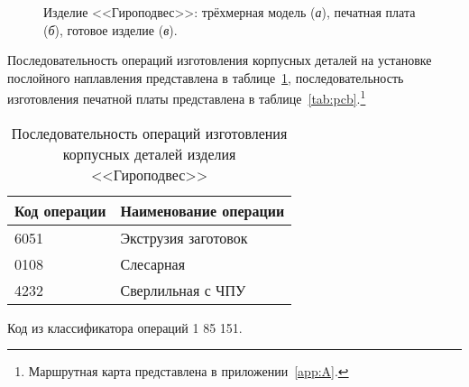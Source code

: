\begin{figure}[htb]
	\caption[Изделие <<Гироподвес>>]%
	{Изделие <<Гироподвес>>: трёхмерная модель (\textit{а}), печатная плата  (\textit{б}), готовое изделие (\textit{в}).}\label{fig:gimbal}
\end{figure}

Последовательность операций изготовления корпусных деталей на установке послойного наплавления представлена в таблице~\cref{tab:case}, последовательность изготовления печатной платы представлена в таблице~\cref{tab:pcb}.\footnote{Маршрутная карта представлена в приложении~\cref{app:A}.}

\begin{table} [!htb]
	\centering
	\caption{Последовательность операций изготовления корпусных деталей изделия <<Гироподвес>>} \vspace{4pt}
	\label{tab:case}
	\begin{threeparttable}
		\begin{tabularx}{\linewidth}{ll}
			\toprule
			\textbf{Код операции\tnote{1}} & \textbf{Наименование операции} \\
			\midrule
			6051 & Экструзия заготовок \\
			0108 & Слесарная \\ 
			4232 & Сверлильная с ЧПУ \\
			\bottomrule
		\end{tabularx}
		\begin{tablenotes} \footnotesize
			\item [1] Код из классификатора операций 1 85 151.
		\end{tablenotes}
	\end{threeparttable}
\end{table}

